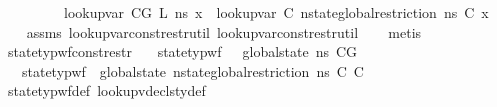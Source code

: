 \begin{isabellebody}
\ \ \ \ \ \ \ \ \ {\isachardoublequoteopen}lookup{\isacharunderscore}{\kern0pt}var\ {\isacharparenleft}{\kern0pt}C{\isacharat}{\kern0pt}G{\isacharcomma}{\kern0pt}\ L{\isacharparenright}{\kern0pt}\ ns\ x\ {\isacharequal}{\kern0pt}\ lookup{\isacharunderscore}{\kern0pt}var\ {\isacharparenleft}{\kern0pt}C{\isacharcomma}{\kern0pt}{\isacharbrackleft}{\kern0pt}{\isacharbrackright}{\kern0pt}{\isacharparenright}{\kern0pt}\ {\isacharparenleft}{\kern0pt}nstate{\isacharunderscore}{\kern0pt}global{\isacharunderscore}{\kern0pt}restriction\ ns\ C{\isacharparenright}{\kern0pt}\ x{\isachardoublequoteclose}\isanewline
%
\isadelimproof
\ \ %
\endisadelimproof
%
\isatagproof
{}\isamarkupfalse%
\ assms\ lookup{\isacharunderscore}{\kern0pt}var{\isacharunderscore}{\kern0pt}const{\isacharunderscore}{\kern0pt}restr{\isacharunderscore}{\kern0pt}util{\isacharunderscore}{\kern0pt}{}\ lookup{\isacharunderscore}{\kern0pt}var{\isacharunderscore}{\kern0pt}const{\isacharunderscore}{\kern0pt}restr{\isacharunderscore}{\kern0pt}util{\isacharunderscore}{\kern0pt}{}\isanewline
\ \ \isamarkupfalse%
\ metis%
\endisatagproof
{\isafoldproof}%
%
\isadelimproof
\isanewline
%
\endisadelimproof
\isanewline
{}\isamarkupfalse%
\ state{\isacharunderscore}{\kern0pt}typ{\isacharunderscore}{\kern0pt}wf{\isacharunderscore}{\kern0pt}const{\isacharunderscore}{\kern0pt}restr{\isacharcolon}{\kern0pt}\isanewline
\ \ \ {\isachardoublequoteopen}state{\isacharunderscore}{\kern0pt}typ{\isacharunderscore}{\kern0pt}wf\ \ {\isacharbrackleft}{\kern0pt}{\isacharbrackright}{\kern0pt}\ {\isacharparenleft}{\kern0pt}global{\isacharunderscore}{\kern0pt}state\ n{\isacharunderscore}{\kern0pt}s{\isacharparenright}{\kern0pt}\ {\isacharparenleft}{\kern0pt}C{\isacharat}{\kern0pt}G{\isacharparenright}{\kern0pt}{\isachardoublequoteclose}\isanewline
\ \ \ {\isachardoublequoteopen}state{\isacharunderscore}{\kern0pt}typ{\isacharunderscore}{\kern0pt}wf\ {\isacharbrackleft}{\kern0pt}{\isacharbrackright}{\kern0pt}\ {\isacharparenleft}{\kern0pt}global{\isacharunderscore}{\kern0pt}state\ {\isacharparenleft}{\kern0pt}nstate{\isacharunderscore}{\kern0pt}global{\isacharunderscore}{\kern0pt}restriction\ n{\isacharunderscore}{\kern0pt}s\ C{\isacharparenright}{\kern0pt}{\isacharparenright}{\kern0pt}\ C{\isachardoublequoteclose}\isanewline
%
\isadelimproof
\ \ %
\endisadelimproof
%
\isatagproof
{}\isamarkupfalse%
\ state{\isacharunderscore}{\kern0pt}typ{\isacharunderscore}{\kern0pt}wf{\isacharunderscore}{\kern0pt}def\ lookup{\isacharunderscore}{\kern0pt}vdecls{\isacharunderscore}{\kern0pt}ty{\isacharunderscore}{\kern0pt}def\ \ \isanewline

\end{isabellebody}
